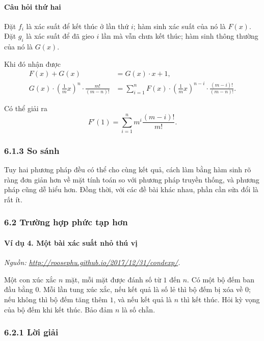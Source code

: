 \documentclass[11pt]{article}
\begin{document}
\paragraph{Câu hỏi thứ hai}
Đặt \(f_i\) là xác suất để kết thúc ở lần thứ \(i\); hàm sinh xác suất của nó là
\(F(x)\). Đặt \(g_i\) là xác suất để đã gieo \(i\) lần mà vẫn chưa kết thúc; hàm
sinh thông thường của nó là \(G(x)\).

Khi đó nhận được
\begin{align}
  F(x)+G(x)&=G(x)\cdot x+1, \tag{9}\\
  G(x)\cdot\left(\frac{1}{m}x\right)^n\cdot\frac{m!}{(m-n)!}
    &=\sum_{i=1}^{n}F(x)\cdot
      \left(\frac{1}{m}x\right)^{n-i}\cdot
      \frac{(m-i)!}{(m-n)!}. \tag{10}
\end{align}

Có thể giải ra
\[
  F'(1)=\sum_{i=1}^{n}m^i\frac{(m-i)!}{m!}.
\]

\subsubsection*{6.1.3 So sánh}

Tuy hai phương pháp đều có thể cho cùng kết quả, cách làm bằng hàm sinh rõ ràng
đơn giản hơn về mặt tính toán so với phương pháp truyền thống, và phương pháp
cũng dễ hiểu hơn. Đồng thời, với các đề bài khác nhau, phần cần sửa đổi là rất
ít.

\subsubsection*{6.2 Trường hợp phức tạp hơn}

\paragraph{Ví dụ 4. Một bài xác suất nhỏ thú vị}
\noindent\emph{Nguồn: \url{http://roosephu.github.io/2017/12/31/condexp/}.}

Một con xúc xắc \(n\) mặt, mỗi mặt được đánh số từ \(1\) đến \(n\). Có một bộ
đếm ban đầu bằng \(0\). Mỗi lần tung xúc xắc, nếu kết quả là số lẻ thì bộ đếm bị
xóa về \(0\); nếu không thì bộ đếm tăng thêm \(1\), và nếu kết quả là \(n\) thì
kết thúc. Hỏi kỳ vọng của bộ đếm khi kết thúc. Bảo đảm \(n\) là số chẵn.

\subsubsection*{6.2.1 Lời giải}
\end{document}
